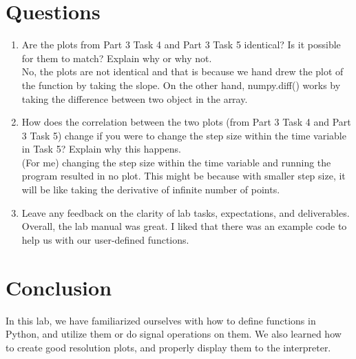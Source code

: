 \documentclass[12pt,a4paper]{article}
\begin{document}
\section{Questions}\label{sec:res}
\begin{enumerate}
    \item
    Are the plots from Part 3 Task 4 and Part 3 Task 5 identical? Is it possible for them to
    match? Explain why or why not.\\
    No, the plots are not identical and that is because we hand drew the plot of the function by taking the slope. On the other hand, numpy.diff() works by taking the difference between two object in the array. 
    
    \item
    How does the correlation between the two plots (from Part 3 Task 4 and Part 3 Task 5)
    change if you were to change the step size within the time variable in Task 5? Explain why
    this happens.\\
    (For me) changing the step size within the time variable and running the program resulted in no plot. This might be because with smaller step size, it will be like taking the derivative of infinite number of points. 
    
    \item
    Leave any feedback on the clarity of lab tasks, expectations, and deliverables.\\
    Overall, the lab manual was great. I liked that there was an example code to help us with our user-defined functions.
\end{enumerate}
\section{Conclusion}\label{sec:res}
    In this lab, we have familiarized ourselves with how to define functions in Python, and utilize them or do signal operations on them. We also learned how to create good resolution plots, and properly display them to the interpreter.


\end{document}
